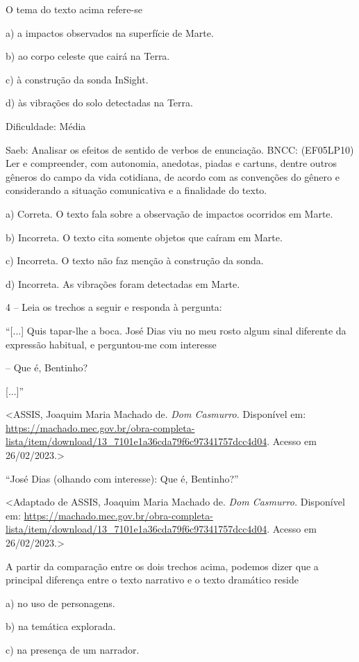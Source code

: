 O tema do texto acima refere-se

a) a impactos observados na superfície de Marte.

b) ao corpo celeste que cairá na Terra.

c) à construção da sonda InSight.

d) às vibrações do solo detectadas na Terra.

Dificuldade: Média

Saeb: Analisar os efeitos de sentido de verbos de enunciação. BNCC:
(EF05LP10) Ler e compreender, com autonomia, anedotas, piadas e cartuns,
dentre outros gêneros do campo da vida cotidiana, de acordo com as
convenções do gênero e considerando a situação comunicativa e a
finalidade do texto.

a) Correta. O texto fala sobre a observação de impactos ocorridos em
Marte.

b) Incorreta. O texto cita somente objetos que caíram em Marte.

c) Incorreta. O texto não faz menção à construção da sonda.

d) Incorreta. As vibrações foram detectadas em Marte.

4 -- Leia os trechos a seguir e responda à pergunta:

``{[}...{]} Quis tapar-lhe a boca. José Dias viu no meu rosto algum
sinal diferente da expressão habitual, e perguntou-me com interesse

-- Que é, Bentinho?

{[}...{]}''

\textless{}ASSIS, Joaquim Maria Machado de. \emph{Dom Casmurro.}
Disponível em:
\url{https://machado.mec.gov.br/obra-completa-lista/item/download/13_7101e1a36cda79f6c97341757dcc4d04}.
Acesso em 26/02/2023.\textgreater{}

``José Dias (olhando com interesse): Que é, Bentinho?''

\textless{}Adaptado de ASSIS, Joaquim Maria Machado de. \emph{Dom
Casmurro.} Disponível em:
\url{https://machado.mec.gov.br/obra-completa-lista/item/download/13_7101e1a36cda79f6c97341757dcc4d04}.
Acesso em 26/02/2023.\textgreater{}

A partir da comparação entre os dois trechos acima, podemos dizer que a
principal diferença entre o texto narrativo e o texto dramático reside

a) no uso de personagens.

b) na temática explorada.

c) na presença de um narrador.

